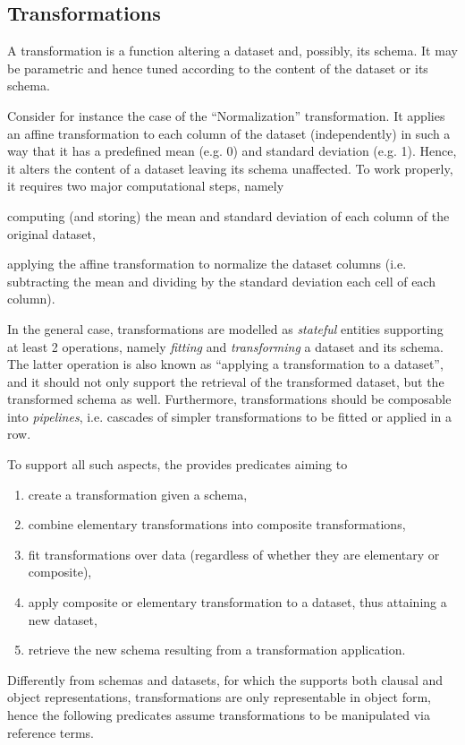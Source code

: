 \documentclass[12pt,a4paper,openright,twoside]{book}
\begin{document}
\subsection{Transformations}

A transformation is a function altering a dataset and, possibly, its schema.
%
It may be parametric and hence tuned according to the content of the dataset or its schema.

Consider for instance the case of the ``Normalization'' transformation.
%
It applies an affine transformation to each column of the dataset (independently) in such a way that it has a predefined mean (e.g. 0) and standard deviation (e.g. 1).
%
Hence, it alters the content of a dataset leaving its schema unaffected.
%
To work properly, it requires two major computational steps, namely
%
\begin{inlinelist}
    \item computing (and storing) the mean and standard deviation of each column of the original dataset,
    \item applying the affine transformation to normalize the dataset columns (i.e. subtracting the mean and dividing by the standard deviation each cell of each column).
\end{inlinelist}

In the general case, transformations are modelled as \emph{stateful} entities supporting at least 2 operations, namely \emph{fitting} and \emph{transforming} a dataset and its schema.
%
The latter operation is also known as ``applying a transformation to a dataset'', and it should not only support the retrieval of the transformed dataset, but the transformed schema as well.
%
Furthermore, transformations should be composable into \emph{pipelines}, i.e. cascades of simpler transformations to be fitted or applied in a row.

To support all such aspects, the \mllib{} provides predicates aiming to
%
\begin{enumerate}
    \item\label{tr:create} create a transformation given a schema,
    \item\label{tr:combine} combine elementary transformations into composite transformations,
    \item\label{tr:fit} fit transformations over data (regardless of whether they are elementary or composite),
    \item\label{tr:transform} apply composite or elementary transformation to a dataset, thus attaining a new dataset,
    \item\label{tr:get-schema} retrieve the new schema resulting from a transformation application.
\end{enumerate}
%
Differently from schemas and datasets, for which the \mllib{} supports both clausal and object representations, transformations are only representable in object form, hence the following predicates assume transformations to be manipulated via reference terms.
\end{document}
